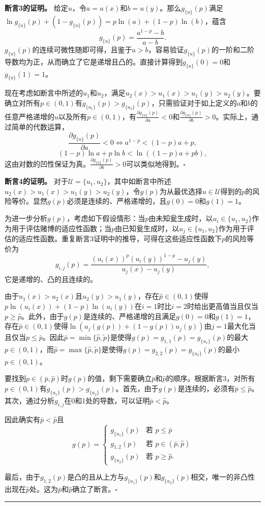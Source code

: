 \documentclass[12pt,a4paper]{article}
\newenvironment{translation}
  {\par\noindent\color{blue!70!black}\smallskip}
  {\par\medskip\hrule\medskip}
\begin{document}
\begin{translation}
\textbf{断言3的证明。} 给定$u$，令$a = u(x)$和$b = u(y)$。那么$g_{\{u\}}(p)$满足$\ln g_{\{u\}}(p) + (1 - g_{\{u\}}(p)) = p\ln(a) + (1-p)\ln(b)$，蕴含
\[
g_{\{u\}}(p) = \frac{a^{1-p} - b}{a - b}.
\]
$g_{\{u\}}(p)$的连续可微性随即可得，且鉴于$a > b$，容易验证$g_{\{u\}}(p)$的一阶和二阶导数均为正，从而确立了它是递增且凸的。直接计算得到$g_{\{u\}}(0) = 0$和$g_{\{u\}}(1) = 1$。

现在考虑如断言中所述的$u_1$和$u_2$，满足$u_2(x) > u_1(x) > u_1(y) > u_2(y)$。要确立对所有$p \in (0, 1)$有$g_{\{u_1\}}(p) > g_{\{u_2\}}(p)$，只需验证对于如上定义的$a$和$b$的任意严格递增的$u$以及所有$p \in (0, 1)$，有$\frac{\partial g_{\{u\}}(p)}{\partial a} < 0$和$\frac{\partial g_{\{u\}}(p)}{\partial b} > 0$。实际上，通过简单的代数运算，
\[
\frac{\partial g_{\{u\}}(p)}{\partial a} < 0 \iff a^{1-p} < (1-p)a + p,
\]
\[
(1-p)\ln a + p\ln b < \ln((1-p)a + pb),
\]
这由对数的凹性保证为真。$\frac{\partial g_{\{u\}}(p)}{\partial b} > 0$可以类似地得到。$\square$

\textbf{断言4的证明。} 对于$\mathcal{U} = \{u_1, u_2\}$，其中如断言中所述$u_2(x) > u_1(x) > u_1(y) > u_2(y)$，令$g(p)$为从最优选择$u \in \mathcal{U}$得到的$p$的风险等价。显然$g(p)$必须是连续的、严格递增的，且$g(0) = 0$和$g(1) = 1$。

为进一步分析$g(p)$，考虑如下假设情形：当$p$由未知瓮生成时，以$u_i \in \{u_1, u_2\}$作为用于评估赌博的适应性函数；当$p$由已知瓮生成时，以$u_j \in \{u_1, u_2\}$作为用于评估的适应性函数。重复断言3证明中的推导，可得在这些适应性函数下$p$的风险等价为
\[
g_{i,j}(p) = \frac{(u_i(x))^p (u_i(y))^{1-p} - u_j(y)}{u_j(x) - u_j(y)},
\]
它是递增的、凸的且连续的。

由于$u_1(x) > u_2(x)$且$u_2(y) > u_1(y)$，存在$\hat{p} \in (0, 1)$使得$p\ln(u_i(x)) + (1-p)\ln(u_i(y))$在$i = 1$时比$i = 2$时给出更高值当且仅当$p \geq \hat{p}$。此外，由于$g(p)$是连续的、严格递增的且满足$g(0) = 0$和$g(1) = 1$，存在$\bar{p} \in (0, 1)$使得$\ln(u_j(g(p)) + (1-g(p))u_j(y))$由$j = 1$最大化当且仅当$p \leq \bar{p}$。因此$\bar{p} = \min\{\hat{p}, \tilde{p}\}$是使得$g(p) = g_{1,1}(p) = g_{\{u_1\}}(p)$的最大$p \in (0, 1)$，而$\hat{p} = \max\{\hat{p}, \tilde{p}\}$是使得$g(p) = g_{2,2}(p) = g_{\{u_2\}}(p)$的最小$p \in (0, 1)$。

要找到$p \in (\bar{p}, \hat{p})$时$g(p)$的值，剩下需要确立$\bar{p}$和$\hat{p}$的顺序。根据断言3，对所有$p \in (0, 1)$有$g_{\{u_1\}}(p) > g_{\{u_2\}}(p)$。首先，由于$g(p)$是连续的，必须有$\bar{p} \leq \hat{p}$。其次，通过分析$g_{i,j}$在0和1处的导数，可以证明$\bar{p} < \hat{p}$。

因此确实有$\bar{p} < \hat{p}$且
\[
g(p) = \begin{cases}
g_{\{u_1\}}(p) & \text{若 } p \leq \bar{p} \\
g_{1,2}(p) & \text{若 } p \in (\bar{p}, \hat{p}) \\
g_{\{u_2\}}(p) & \text{若 } p \geq \hat{p}.
\end{cases}
\]

最后，由于$g_{1,2}(p)$是凸的且从上方与$g_{\{u_1\}}(p)$和$g_{\{u_2\}}(p)$相交，唯一的非凸性出现在$\hat{p}$处。这为$\bar{p}$和$\hat{p}$确立了断言。$\square$
\end{translation}
\newpage
\end{document}
